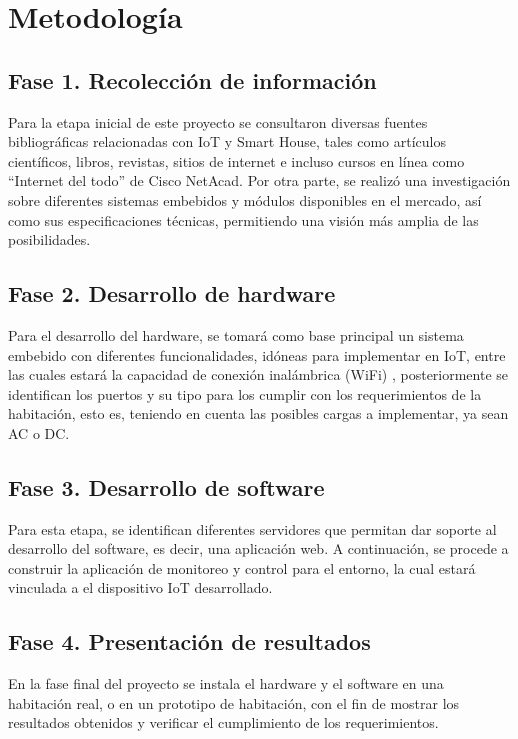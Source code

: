 \chapter{Metodología}

\section{Fase 1. Recolección de información} 
	Para la etapa inicial de este proyecto se consultaron diversas fuentes bibliográficas relacionadas con IoT y Smart House, tales como artículos científicos, libros, revistas, sitios de internet e incluso cursos en línea como “Internet del todo” de Cisco NetAcad. Por otra parte, se realizó una investigación sobre diferentes sistemas embebidos y módulos disponibles en el mercado, así como sus especificaciones técnicas, permitiendo una visión más amplia de las posibilidades. \\

\section{Fase 2. Desarrollo de hardware}
	Para el desarrollo del hardware, se tomará como base principal un sistema embebido con diferentes funcionalidades, idóneas para implementar en IoT, entre las cuales estará la capacidad de conexión inalámbrica (WiFi) , posteriormente se identifican los puertos y su tipo para los cumplir con los requerimientos de la habitación, esto es, teniendo en cuenta las posibles cargas a implementar, ya sean AC o DC. \\

\section{Fase 3. Desarrollo de software}
	Para esta etapa, se identifican diferentes servidores que permitan dar soporte al desarrollo del software, es decir, una aplicación web. A continuación, se procede a construir la aplicación de monitoreo y control para el entorno, la cual estará vinculada a el dispositivo IoT desarrollado.\\

\section{Fase 4. Presentación de resultados} 
	En la fase final del proyecto se instala el hardware y el software en una habitación real, o en un prototipo de habitación, con el fin de mostrar los resultados obtenidos y verificar el cumplimiento de los requerimientos.\\